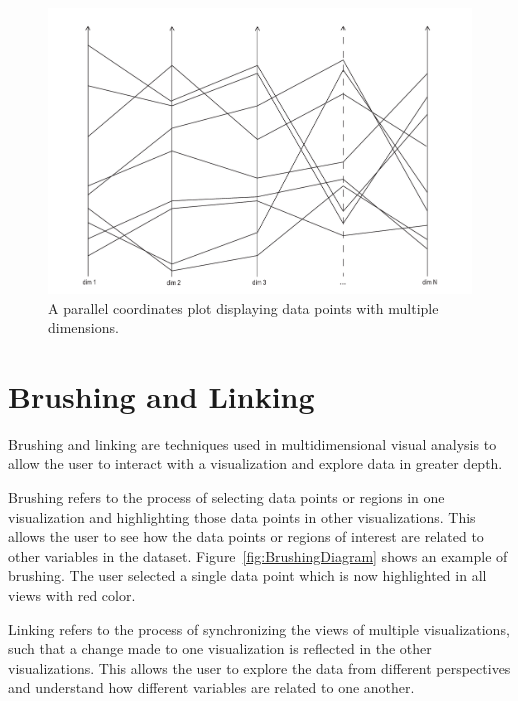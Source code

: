 \begin{figure}[tp]
\centering
\includegraphics[frame,keepaspectratio,width=\linewidth,height=\halfh]
{diagrams/parallel-coordinates.pdf}

\caption[Parallel Coordinates]
{
A parallel coordinates plot displaying data points with multiple dimensions.
}
\label{fig:ParallelCoordinatesDiagram}
\end{figure}






\section{Brushing and Linking}

Brushing and linking are techniques used in multidimensional visual
analysis to allow the user to interact with a visualization and
explore data in greater depth.

Brushing refers to the process of selecting data points or regions in one
visualization and highlighting those data points in other visualizations.
This allows the user to see how the data points or regions of interest are
related to other variables in the dataset.
Figure~\ref{fig:BrushingDiagram} shows an example of brushing. The user
selected a single data point which is now highlighted in all views with
red color.

Linking refers to the process of synchronizing the views of multiple
visualizations, such that a change made to one visualization is
reflected in the other visualizations. This allows the user to explore
the data from different perspectives and understand how different
variables are related to one another.

